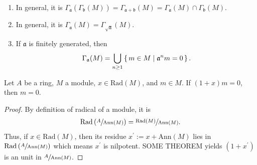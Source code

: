 \begin{example}
\begin{enumerate}
\begin{proof}
            ``\(\subset\)'': \(M \subset N\) implies \(\Gamma_\mathfrak{a}(M) \subset \Gamma_\mathfrak{a}(N)\). Moreover, it is \(\Gamma_\mathfrak{a}(M) \subset M\). Thus, \(\Gamma_\mathfrak{a}(M) \subset \Gamma_\mathfrak{a}(N) \cap M\).

            ``\(\supset\)'': Let \(m \in \Gamma_\mathfrak{a}(N) \cap M\). It is
            
            \begin{align*}
                m \in \Gamma_\mathfrak{a}(N) \cap M & \Rightarrow \mathfrak{a} \subset \sqrt{\mathrm{Ann}(m)} \text{ and } m \in M \text{.} \\
                & \Rightarrow m \in \Gamma_\mathfrak{a}(M) \text{.}
            \end{align*}

            Hence, \(\Gamma_\mathfrak{a}(N) \cap M \subset \Gamma_\mathfrak{a}(M)\).
        \end{proof}
            \item In general, it is \(\Gamma_\mathfrak{a}(\Gamma_\mathfrak{b}(M)) = \Gamma_{\mathfrak{a} + \mathfrak{b}}(M) = \Gamma_\mathfrak{a}(M) \cap \Gamma_\mathfrak{b}(M)\).
            \item In general, it is \(\Gamma_\mathfrak{a}(M) = \Gamma_{\sqrt{\mathfrak{a}}}(M)\).
            \item If \(\mathfrak{a}\) is finitely generated, then
            \begin{align*}
                \Gamma_\mathfrak{a}(M) = \bigcup_{n \geq 1} \left\{\, m \in M \mid \mathfrak{a}^n m = 0 \,\right\} \text{.}
            \end{align*}
    \end{enumerate}
\end{example}

\begin{example}
    Let \(A\) be a ring, \(M\) a module, \(x \in \mathrm{Rad}(M)\), and \(m \in M\). If \((1 + x)m = 0\), then \(m = 0\).
\end{example}

\begin{proof}
    By definition of radical of a module, it is
    \begin{align*}
        \mathrm{Rad} \left(\sfrac{A}{\mathrm{Ann}(M)}\right) = \sfrac{\mathrm{Rad}(M)}{\mathrm{Ann}(M)} \text{.}
    \end{align*}
    Thus, if \(x \in \mathrm{Rad}(M)\), then its residue \(x^\prime := x + \mathrm{Ann}(M)\) lies in \(\mathrm{Rad}\left(\sfrac{A}{\mathrm{Ann}(M)}\right)\) which means \(x^\prime\) is nilpotent. SOME THEOREM yields \((1 + x^\prime)\) is an unit in \(\sfrac{A}{\mathrm{Ann}(M)}\).
\end{proof}
